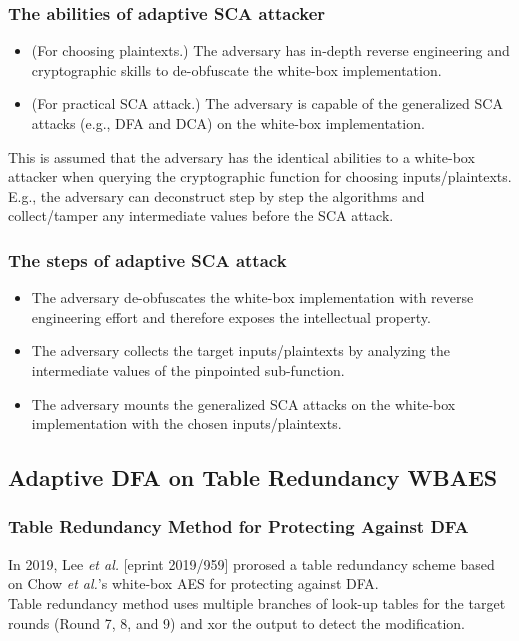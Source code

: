 \documentclass{beamer}
\begin{document}

\frame
{
	\frametitle{The abilities of adaptive SCA attacker}
	\begin{itemize}
		\item (For choosing plaintexts.) The adversary has in-depth reverse engineering and cryptographic skills to de-obfuscate the white-box implementation.
		\item (For practical SCA attack.) The adversary is capable of the generalized SCA attacks (e.g., DFA and DCA) on the white-box implementation.
	\end{itemize}
	This is assumed that the adversary has the identical abilities to a white-box attacker when querying the cryptographic function for choosing inputs/plaintexts. E.g., the adversary can deconstruct step by step the algorithms and collect/tamper any intermediate values before the SCA attack.
}

\frame
{
	\frametitle{The steps of adaptive SCA attack}
	\begin{itemize}
		\item The adversary de-obfuscates the white-box implementation with reverse engineering effort and therefore exposes the intellectual property.
		\item The adversary collects the target inputs/plaintexts by analyzing the intermediate values of the pinpointed sub-function.
		\item The adversary mounts the generalized SCA attacks on the white-box implementation with the chosen inputs/plaintexts.
	\end{itemize}
}

\subsection{Adaptive DFA on Table Redundancy WBAES}
\frame
{
	\frametitle{Table Redundancy Method for Protecting Against DFA}
	In 2019, Lee \textit{et al.} [eprint 2019/959] prorosed a table redundancy scheme based on Chow \textit{et al.}'s white-box AES for protecting against DFA.
	\\[2ex]
	Table redundancy method uses multiple branches of look-up tables for the target rounds (Round 7, 8, and 9) and xor the output to detect the modification.
}
\end{document}
